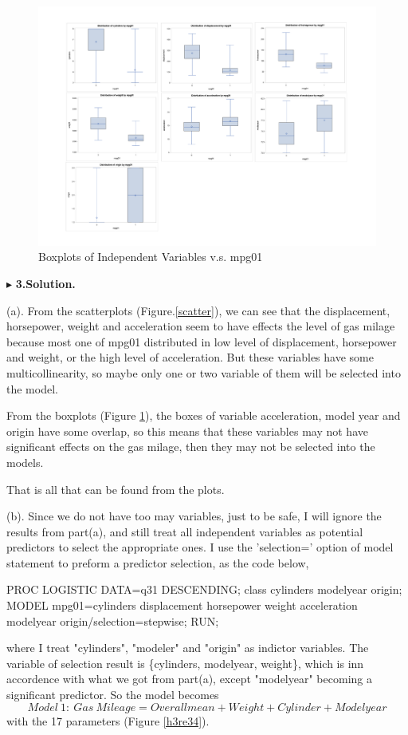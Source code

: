 \documentclass[letterpaper, 12pt]{article}
\begin{document}
\begin{figure}[htbp]
  \centering
  \caption{Boxplots of Independent Variables v.s. mpg01}\label{boxplot}
  \includegraphics[width=\textwidth]{boxplots.pdf}
\end{figure}

$\blacktriangleright$ \textbf{3.\quad Solution.} 


(a). From the scatterplots (Figure.\ref{scatter}), we can see that the displacement, horsepower, weight and acceleration seem to have effects the level of gas milage because most one of mpg01 distributed in low level of displacement, horsepower and weight, or the high level of acceleration. But these variables have some multicollinearity, so maybe only one or two variable of them will be selected into the model.

From the boxplots (Figure \ref{boxplot}), the boxes of variable acceleration, model year and origin have some overlap, so this means that these variables may not have significant effects on the gas milage, then they may not be selected into the models.

That is all that can be found from the plots.

(b). Since we do not have too may variables, just to be safe, I will ignore the results from part(a), and still treat all independent variables as potential predictors to select the appropriate ones. I use the 'selection=' option of model statement to preform a predictor selection, as the code below,
\begin{Sascode}[store=class]
PROC LOGISTIC DATA=q31 DESCENDING;
class cylinders modelyear origin;
MODEL mpg01=cylinders displacement horsepower weight
 acceleration modelyear origin/selection=stepwise;
RUN;
\end{Sascode}
where I treat "cylinders", "modeler" and "origin" as indictor variables. The variable of selection result is \{cylinders, modelyear, weight\}, which is inn accordence with what we got from part(a), except "modelyear" becoming a significant predictor. So the model becomes 
$$
Model~1:~Gas~Mileage=Overallmean+Weight+Cylinder+Modelyear
$$
with the 17 parameters (Figure \ref{h3re34}).
\end{document}
